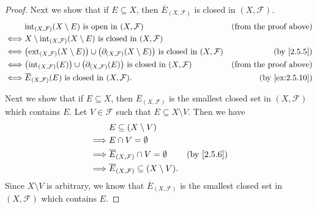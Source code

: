 \begin{proof}
  Next we show that if \(E \subseteq X\), then \(\overline{E}_{(X, \mathcal{F})}\) is closed in \((X, \mathcal{F})\).
  \begin{align*}
         & \text{int}_{(X, \mathcal{F})}(X \setminus E) \text{ is open in } (X, \mathcal{F})                                                                       & \text{(from the proof above)} \\
    \iff & X \setminus \text{int}_{(X, \mathcal{F})}(X \setminus E) \text{ is closed in } (X, \mathcal{F})                                                                                         \\
    \iff & \big(\text{ext}_{(X, \mathcal{F})}(X \setminus E)\big) \cup \big(\partial_{(X, \mathcal{F})}(X \setminus E)\big) \text{ is closed in } (X, \mathcal{F}) & \text{(by \cref{2.5.5})}      \\
    \iff & \big(\text{int}_{(X, \mathcal{F})}(E)\big) \cup \big(\partial_{(X, \mathcal{F})}(E)\big) \text{ is closed in } (X, \mathcal{F})                         & \text{(from the proof above)} \\
    \iff & \overline{E}_{(X, \mathcal{F})}(E) \text{ is closed in } (X, \mathcal{F}).                                                                              & \text{(by \cref{ex:2.5.10})}
  \end{align*}

  Next we show that if \(E \subseteq X\), then \(\overline{E}_{(X, \mathcal{F})}\) is the smallest closed set in \((X, \mathcal{F})\) which contains \(E\).
  Let \(V \in \mathcal{F}\) such that \(E \subseteq X \setminus V\).
  Then we have
  \begin{align*}
             & E \subseteq (X \setminus V)                                                           \\
    \implies & E \cap V = \emptyset                                                                  \\
    \implies & \overline{E}_{(X, \mathcal{F})} \cap V = \emptyset         & \text{(by \cref{2.5.6})} \\
    \implies & \overline{E}_{(X, \mathcal{F})} \subseteq (X \setminus V).
  \end{align*}
  Since \(X \setminus V\) is arbitrary, we know that \(\overline{E}_{(X, \mathcal{F})}\) is the smallest closed set in \((X, \mathcal{F})\) which contains \(E\).


\end{proof}
